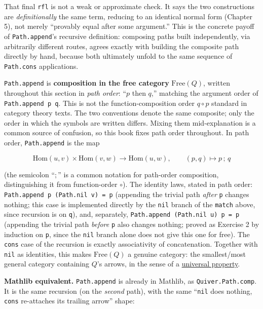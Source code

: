 That final \texttt{rfl} is not a weak or approximate check. It says the two constructions are \emph{definitionally} the same term, reducing to an identical normal form (Chapter 5), not merely ``provably equal after some argument.'' This is the concrete payoff of \texttt{Path.append}'s recursive definition: composing paths built independently, via arbitrarily different routes, agrees exactly with building the composite path directly by hand, because both ultimately unfold to the same sequence of \texttt{Path.cons} applications.

\begin{mathreading}

\texttt{Path.append} is \textbf{composition in the free category} \(\mathrm{Free}(Q)\), written throughout this section in \emph{path order}: ``\(p\) then \(q\),'' matching the argument order of \texttt{Path.append p q}. This is not the function-composition order \(q \circ p\) standard in category theory texts. The two conventions denote the same composite; only the order in which the symbols are written differs. Mixing them mid-explanation is a common source of confusion, so this book fixes path order throughout. In path order, \texttt{Path.append} is the map

\end{mathreading}

\[
\mathrm{Hom}(u,v) \times \mathrm{Hom}(v,w) \longrightarrow \mathrm{Hom}(u,w),
\qquad (p, q) \longmapsto p\,;\,q
\]

(the semicolon ``\(;\)'' is a common notation for path-order composition, distinguishing it from function-order \(\circ\)). The identity laws, stated in path order: \texttt{Path.append p (Path.nil v) = p} (appending the trivial path \emph{after} \texttt{p} changes nothing; this case is implemented directly by the \texttt{nil} branch of the \texttt{match} above, since recursion is on \texttt{q}), and, separately, \texttt{Path.append (Path.nil u) p = p} (appending the trivial path \emph{before} \texttt{p} also changes nothing; proved as Exercise 2 by induction on \texttt{p}, since the \texttt{nil} branch alone does not give this one for free). The \texttt{cons} case of the recursion is exactly associativity of concatenation. Together with \texttt{nil} as identities, this makes \(\mathrm{Free}(Q)\) a genuine category: the smallest/most general category containing \(Q\)'s arrows, in the sense of a \hyperref[sec:01-basics:04-terminology:1]{universal property}.

\textbf{Mathlib equivalent.} \texttt{Path.append} is already in Mathlib, as \texttt{Quiver.Path.comp}. It is the same recursion (on the \emph{second} path), with the same ``\texttt{nil} does nothing, \texttt{cons} re-attaches its trailing arrow'' shape:


